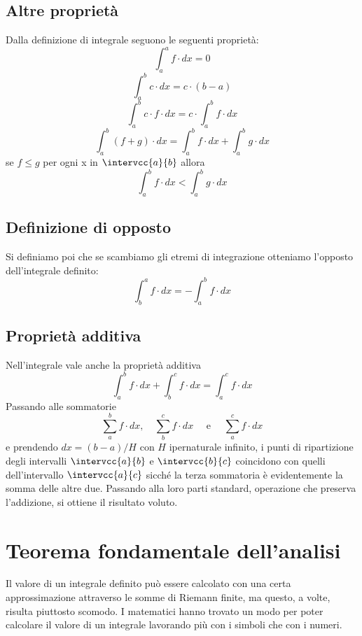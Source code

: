 \subsection{Altre proprietà }
\label{subsec:integrali_altre_proprieta}

Dalla definizione di integrale seguono le seguenti proprietà:
\[\int_a^a f \cdot dx=0\] 
\[\int_a^b c \cdot dx = c \cdot (b-a)\] 
\[\int_a^b c \cdot f \cdot dx = c\cdot\int_a^b f \cdot dx\] 
\[\int_a^b (f+g)\cdot dx = 
  \int_a^b f \cdot dx + \int_a^b g\cdot dx\]
se \(f \le g\) per ogni x in \(\intervcc{a}{b}\) allora 
\[\int_a^b f \cdot dx < \int_a^b g\cdot dx\]


\subsection{Definizione di opposto}
\label{subsec:integrali_opposto}

Si definiamo poi che se scambiamo gli etremi di integrazione otteniamo 
l'opposto dell'integrale definito:
\[\int_b^a f \cdot dx = - \int_a^b f \cdot dx\]

\subsection{Proprietà additiva}
\label{subsec:integrali_proprieta_additiva}

Nell'integrale vale anche la proprietà additiva 
\[\int_a^b f \cdot dx + \int_b^c f \cdot dx = \int_a^c f \cdot 
dx\] 
Passando alle sommatorie 
\[\sum_a^b f \cdot dx,\quad \sum_b^c f \cdot dx \quad\text{ e } \quad 
  \sum_a^c f \cdot dx\] 
e prendendo 
\(dx = (b-a)/H\)
con \(H\) ipernaturale infinito, 
i punti di ripartizione degli intervalli \(\intervcc{a}{b}\) e 
\(\intervcc{b}{c}\) coincidono con quelli dell'intervallo \(\intervcc{a}{c}\)
sicché la terza sommatoria è evidentemente la somma delle altre due.
Passando alla loro parti standard, operazione che preserva l'addizione, si 
ottiene il risultato voluto.

\section{Teorema fondamentale dell'analisi}
\label{sec:integrali_teorema_fondamentale}

Il valore di un integrale definito può essere calcolato con una certa 
approssimazione attraverso le somme di Riemann finite, ma questo, a volte, 
risulta piuttosto scomodo. I matematici hanno trovato un modo per poter 
calcolare il valore di un integrale lavorando più con i simboli che con i 
numeri.

